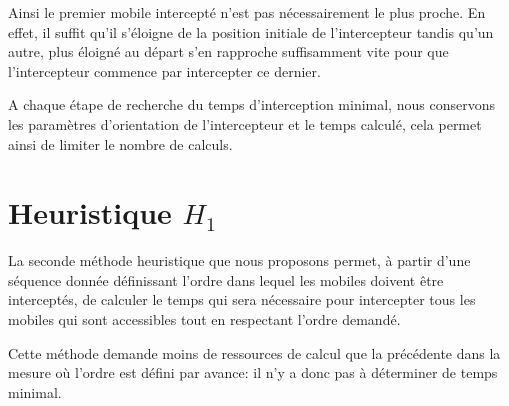 	Ainsi le premier mobile intercepté n'est pas nécessairement le plus proche. En effet, il suffit qu'il s'éloigne de la position initiale de l'intercepteur tandis qu'un autre, plus éloigné au départ s'en rapproche suffisamment vite pour que l'intercepteur commence par intercepter ce dernier.

	A chaque étape de recherche du temps d'interception minimal, nous conservons les paramètres d'orientation de l'intercepteur et le temps calculé, cela permet ainsi de limiter le nombre de calculs.

\section{Heuristique $H_1$}
	La seconde méthode heuristique que nous proposons permet, à partir d'une séquence donnée définissant l'ordre dans lequel les mobiles doivent être interceptés, de calculer le temps qui sera nécessaire pour intercepter tous les mobiles qui sont accessibles tout en respectant l'ordre demandé.

	Cette méthode demande moins de ressources de calcul que la précédente dans la mesure où l'ordre est défini par avance: il n'y a donc pas à déterminer de temps minimal.

